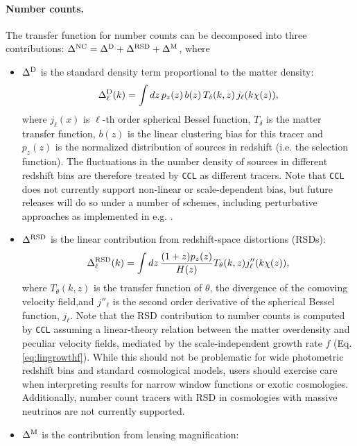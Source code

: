 \documentclass[\docopts]{\docclass}
\newcommand{\ccl}{{\tt CCL}\xspace}
\begin{document}
\paragraph{\bf Number counts.} The transfer function for number counts can be decomposed into three contributions: $\Delta^{\rm NC}=\Delta^{\rm D}+\Delta^{\rm RSD}+\Delta^{\rm M}$, where
\begin{itemize}
  \item $\Delta^{\rm D}$ is the standard density term proportional to the matter density:
        \begin{equation}\label{eq:transfer_nc}
          \Delta^{\rm D}_\ell(k)=\int dz\,p_z(z)\,b(z)\,T_\delta(k,z)\,j_\ell(k\chi(z)),
        \end{equation}
        where $j_\ell(x)$ is $\ell$-th order spherical Bessel function, $T_\delta$ is the matter transfer function, $b(z)$ is the linear clustering bias for this tracer and $p_z(z)$ is the normalized distribution of sources in redshift (i.e. the selection function). The fluctuations in the number density of sources in different redshift bins are therefore treated by \ccl as different tracers. Note that \ccl does not currently support non-linear or scale-dependent bias, but future releases will do so under a number of schemes, including perturbative approaches as implemented in e.g. \citet{FASTPT}.
  \item $\Delta^{\rm RSD}$ is the linear contribution from redshift-space distortions (RSDs):
        \begin{equation}\label{eq:transfer_rsd}
          \Delta^{\rm RSD}_\ell(k)=\int dz\,\frac{(1+z) p_z(z)}{H(z)}T_\theta(k,z) j_\ell''(k\chi(z)),
        \end{equation}
        where $T_\theta(k,z)$ is the transfer function of $\theta$, the divergence of the comoving velocity field,and $j''_\ell$ is the second order derivative of the spherical Bessel function, $j_\ell$. Note that the RSD contribution to number counts is computed by \ccl assuming a linear-theory relation between the matter overdensity and peculiar velocity fields, mediated by the scale-independent growth rate $f$ (Eq. \ref{eq:lingrowthf}). While this should not be problematic for wide photometric redshift bins and standard cosmological models, users should exercise care when interpreting results for narrow window functions or exotic cosmologies. Additionally, number count tracers with RSD in cosmologies with massive neutrinos are not currently supported.
  \item $\Delta^{\rm M}$ is the contribution from lensing magnification:

\end{itemize}
\end{document}
